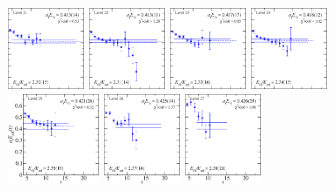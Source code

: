 \begin{figure}[H]
    \includegraphics[width=0.18\textwidth]{figures/sigmas/hg/fits/fit_26.pdf}
    \includegraphics[width=0.18\textwidth]{figures/sigmas/hg/fits/fit_16.pdf}
    \includegraphics[width=0.18\textwidth]{figures/sigmas/hg/fits/fit_20.pdf}
    \includegraphics[width=0.18\textwidth]{figures/sigmas/hg/fits/fit_17.pdf}\\
    \includegraphics[width=0.215\textwidth]{figures/sigmas/hg/fits/fit_28.pdf}
    \includegraphics[width=0.18\textwidth]{figures/sigmas/hg/fits/fit_32.pdf}
    \includegraphics[width=0.18\textwidth]{figures/sigmas/hg/fits/fit_39.pdf}

\end{figure}
